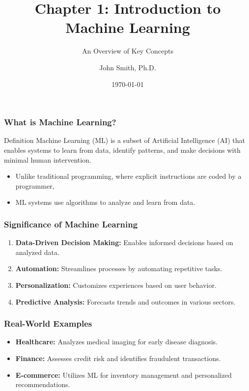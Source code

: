 \documentclass[aspectratio=169]{beamer}
\title[Introduction to Machine Learning]{Chapter 1: Introduction to Machine Learning}
\subtitle{An Overview of Key Concepts}
\author[J. Smith]{John Smith, Ph.D.}
\institute[University Name]{
  Department of Computer Science\\
  University Name\\
  \vspace{0.3cm}
  Email: email@university.edu\\
  Website: www.university.edu
}
\date{\today}
\begin{document}
\frame{\titlepage}

\begin{frame}[fragile]
    \titlepage
\end{frame}

\begin{frame}[fragile]
    \frametitle{What is Machine Learning?}
    \begin{block}{Definition}
        Machine Learning (ML) is a subset of Artificial Intelligence (AI) that enables systems to learn from data, identify patterns, and make decisions with minimal human intervention.
    \end{block}
    \begin{itemize}
        \item Unlike traditional programming, where explicit instructions are coded by a programmer,
        \item ML systems use algorithms to analyze and learn from data.
    \end{itemize}
\end{frame}

\begin{frame}[fragile]
    \frametitle{Significance of Machine Learning}
    \begin{enumerate}
        \item \textbf{Data-Driven Decision Making:} Enables informed decisions based on analyzed data.
        \item \textbf{Automation:} Streamlines processes by automating repetitive tasks.
        \item \textbf{Personalization:} Customizes experiences based on user behavior.
        \item \textbf{Predictive Analysis:} Forecasts trends and outcomes in various sectors.
    \end{enumerate}
\end{frame}

\begin{frame}[fragile]
    \frametitle{Real-World Examples}
    \begin{itemize}
        \item \textbf{Healthcare:} Analyzes medical imaging for early disease diagnosis.
        \item \textbf{Finance:} Assesses credit risk and identifies fraudulent transactions.
        \item \textbf{E-commerce:} Utilizes ML for inventory management and personalized recommendations.
    \end{itemize}
\end{frame}
\end{document}
